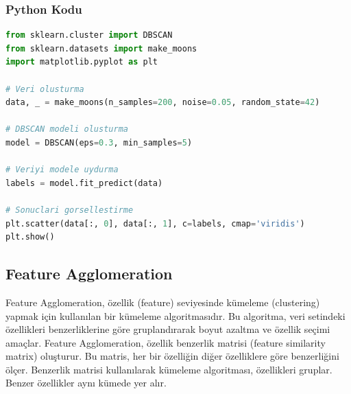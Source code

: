\begin{table}[h]
\centering
{\scriptsize\renewcommand{\arraystretch}{0.4}
{}}
\end{table}

\subsubsection{Python Kodu}

\begin{lstlisting}[language=Python, caption=Scikit-learn'de DBSCAN.]
from sklearn.cluster import DBSCAN
from sklearn.datasets import make_moons
import matplotlib.pyplot as plt

# Veri olusturma
data, _ = make_moons(n_samples=200, noise=0.05, random_state=42)

# DBSCAN modeli olusturma
model = DBSCAN(eps=0.3, min_samples=5)

# Veriyi modele uydurma
labels = model.fit_predict(data)

# Sonuclari gorsellestirme
plt.scatter(data[:, 0], data[:, 1], c=labels, cmap='viridis')
plt.show()
\end{lstlisting}

\newpage

\subsection{Feature Agglomeration}
Feature Agglomeration, özellik (feature) seviyesinde kümeleme (clustering) yapmak için kullanılan bir kümeleme algoritmasıdır. Bu algoritma, veri setindeki özellikleri benzerliklerine göre gruplandırarak boyut azaltma ve özellik seçimi amaçlar. Feature Agglomeration, özellik benzerlik matrisi (feature similarity matrix) oluşturur. Bu matris, her bir özelliğin diğer özelliklere göre benzerliğini ölçer. Benzerlik matrisi kullanılarak kümeleme algoritması, özellikleri gruplar. Benzer özellikler aynı kümede yer alır.

